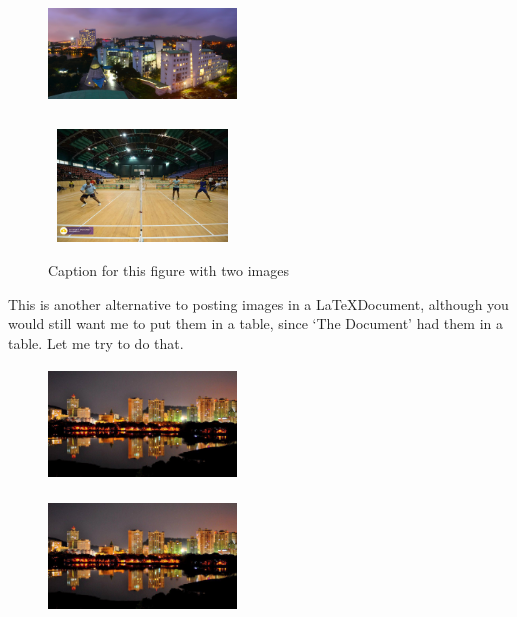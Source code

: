 \documentclass[11pt,a4paper]{article}
\begin{document}
\begin{figure}
\centering
\parbox{5cm}{
\includegraphics[width=5cm, height=3cm]{img1.jpg}
\captionsetup{(a) Caption 1}
\centering
\label{fig:2figsA}}
\qquad
\begin{minipage}{5cm}
\includegraphics[width=5cm, height=3cm]{img2.jpg}   
\captionsetup{(b) Caption 2}
\centering
\label{fig:2figsB}
\end{minipage}
\caption{Caption for this figure with two images}
\end{figure}
\bigbreak
\quad This is another alternative to posting images in a \LaTeX{}Document,
although you would still want me to put them in a table, since ‘The
Document’ had them in a table. Let me try to do that.
\bigbreak
\begin{figure}[h!]
\centering
\parbox{5cm}{
\includegraphics[width=5cm, height=3cm]{img3.jpg}
\centering
\label{fig:2figsA}}
\begin{minipage}{5cm}
\includegraphics[width=5cm, height=3cm]{img3.jpg}   
\centering
\label{fig:2figsB}
\end{minipage}
\end{figure}
\end{document}
